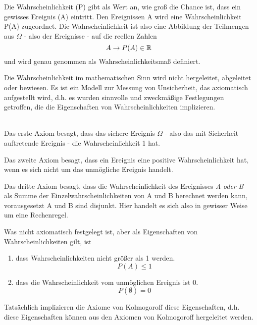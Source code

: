 Die Wahrscheinlichkeit (P) gibt als Wert an, wie groß die Chance ist, dass ein gewisses Ereignis (A) eintritt. Den Ereignissen A wird eine Wahrscheinlichkeit P(A) zugeordnet. Die Wahrscheinlichkeit ist also eine Abbildung der Teilmengen aus $\Omega$ - also der Ereignisse - auf die reellen Zahlen
$$A \rightarrow P(A)\in \mathbb{R}$$
und wird genau genommen als Wahrscheinlichkeitsmaß definiert.

Die Wahrscheinlichkeit im mathematischen Sinn wird nicht hergeleitet, abgeleitet oder bewiesen. Es ist ein Modell zur Messung von Unsicherheit, das axiomatisch aufgestellt wird, d.h. es wurden sinnvolle und zweckmäßige Festlegungen getroffen, die die Eigenschaften von Wahrscheinlichkeiten implizieren.


	\\

Das erste Axiom besagt, dass das sichere Ereignis $\Omega$ - also das mit Sicherheit auftretende Ereignis - die Wahrscheinlichkeit 1 hat. 

Das zweite Axiom besagt, dass ein Ereignis eine positive Wahrscheinlichkeit hat, wenn es sich nicht um das unmögliche Ereignis handelt.
 
Das dritte Axiom besagt, dass die Wahrscheinlichkeit des Ereignisses \emph{A oder B} als Summe der Einzelwahrscheinlichkeiten von A und B berechnet werden kann, vorausgesetzt A und B sind disjunkt. Hier handelt es sich also in gewisser Weise um eine Rechenregel.

Was nicht axiomatisch festgelegt ist, aber als Eigenschaften von Wahrscheinlichkeiten gilt, ist 
\begin{enumerate}
    \item dass Wahrscheinlichkeiten nicht größer als 1 werden.
    $$P(A)\leq 1$$
    \item dass die Wahrscheinlichkeit vom unmöglichen Ereignis ist 0.
    $$P(\emptyset)=0$$
\end{enumerate}

Tatsächlich implizieren die Axiome von Kolmogoroff diese Eigenschaften, d.h. diese Eigenschaften können aus den Axiomen von Kolmogoroff hergeleitet werden.

